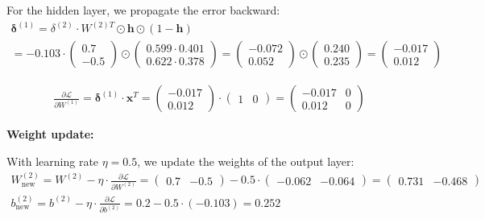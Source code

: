 For the hidden layer, we propagate the error backward:
\begin{gather*}
	\boldsymbol{\delta}^{(1)} = \delta^{(2)} \cdot W^{(2)T} \odot \mathbf{h} \odot (1 - \mathbf{h}) \\
	= -0.103 \cdot \begin{pmatrix} 0.7 \\ -0.5 \end{pmatrix} \odot \begin{pmatrix} 0.599 \cdot 0.401 \\ 0.622 \cdot 0.378 \end{pmatrix}
	= \begin{pmatrix} -0.072 \\ 0.052 \end{pmatrix} \odot \begin{pmatrix} 0.240 \\ 0.235 \end{pmatrix}
	= \begin{pmatrix} -0.017 \\ 0.012 \end{pmatrix}
\end{gather*}

\begin{gather*}
	\frac{\partial \mathcal{L}}{\partial W^{(1)}} = \boldsymbol{\delta}^{(1)} \cdot \mathbf{x}^T = \begin{pmatrix} -0.017 \\ 0.012 \end{pmatrix} \cdot \begin{pmatrix} 1 & 0 \end{pmatrix} = \begin{pmatrix} -0.017 & 0 \\ 0.012 & 0 \end{pmatrix}
\end{gather*}

\textbf{Weight update:}

With learning rate \(\eta = 0.5\), we update the weights of the output layer:
\begin{gather*}
	W^{(2)}_{\text{new}} = W^{(2)} - \eta \cdot \frac{\partial \mathcal{L}}{\partial W^{(2)}} = \begin{pmatrix} 0.7 & -0.5 \end{pmatrix} - 0.5 \cdot \begin{pmatrix} -0.062 & -0.064 \end{pmatrix} = \begin{pmatrix} 0.731 & -0.468 \end{pmatrix} \\[0.3em]
	b^{(2)}_{\text{new}} = b^{(2)} - \eta \cdot \frac{\partial \mathcal{L}}{\partial b^{(2)}} = 0.2 - 0.5 \cdot (-0.103) = 0.252
\end{gather*}

